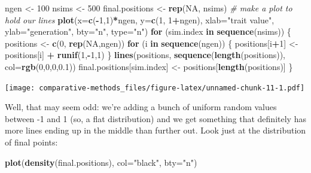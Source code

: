 \documentclass[]{article}
\newenvironment{Shaded}{\begin{snugshade}}{\end{snugshade}}
\newcommand{\CommentTok}[1]{\textcolor[rgb]{0.56,0.35,0.01}{\textit{#1}}}
\newcommand{\ControlFlowTok}[1]{\textcolor[rgb]{0.13,0.29,0.53}{\textbf{#1}}}
\newcommand{\DataTypeTok}[1]{\textcolor[rgb]{0.13,0.29,0.53}{#1}}
\newcommand{\DecValTok}[1]{\textcolor[rgb]{0.00,0.00,0.81}{#1}}
\newcommand{\FloatTok}[1]{\textcolor[rgb]{0.00,0.00,0.81}{#1}}
\newcommand{\KeywordTok}[1]{\textcolor[rgb]{0.13,0.29,0.53}{\textbf{#1}}}
\newcommand{\NormalTok}[1]{#1}
\newcommand{\OperatorTok}[1]{\textcolor[rgb]{0.81,0.36,0.00}{\textbf{#1}}}
\newcommand{\OtherTok}[1]{\textcolor[rgb]{0.56,0.35,0.01}{#1}}
\newcommand{\StringTok}[1]{\textcolor[rgb]{0.31,0.60,0.02}{#1}}
\theoremstyle{definition}
\theoremstyle{definition}
\theoremstyle{definition}
\theoremstyle{remark}
\begin{document}
\begin{Shaded}
\begin{Highlighting}[]
\NormalTok{ngen <-}\StringTok{ }\DecValTok{100}
\NormalTok{nsims <-}\StringTok{ }\DecValTok{500}
\NormalTok{final.positions <-}\StringTok{ }\KeywordTok{rep}\NormalTok{(}\OtherTok{NA}\NormalTok{, nsims)}
\CommentTok{# make a plot to hold our lines}
\KeywordTok{plot}\NormalTok{(}\DataTypeTok{x=}\KeywordTok{c}\NormalTok{(}\OperatorTok{-}\DecValTok{1}\NormalTok{,}\DecValTok{1}\NormalTok{)}\OperatorTok{*}\NormalTok{ngen, }\DataTypeTok{y=}\KeywordTok{c}\NormalTok{(}\DecValTok{1}\NormalTok{, }\DecValTok{1}\OperatorTok{+}\NormalTok{ngen), }\DataTypeTok{xlab=}\StringTok{"trait value"}\NormalTok{, }\DataTypeTok{ylab=}\StringTok{"generation"}\NormalTok{, }\DataTypeTok{bty=}\StringTok{"n"}\NormalTok{, }\DataTypeTok{type=}\StringTok{"n"}\NormalTok{)}
\ControlFlowTok{for}\NormalTok{ (sim.index }\ControlFlowTok{in} \KeywordTok{sequence}\NormalTok{(nsims)) \{}
\NormalTok{  positions <-}\StringTok{ }\KeywordTok{c}\NormalTok{(}\DecValTok{0}\NormalTok{, }\KeywordTok{rep}\NormalTok{(}\OtherTok{NA}\NormalTok{,ngen))}
  \ControlFlowTok{for}\NormalTok{ (i }\ControlFlowTok{in} \KeywordTok{sequence}\NormalTok{(ngen)) \{}
\NormalTok{    positions[i}\OperatorTok{+}\DecValTok{1}\NormalTok{] <-}\StringTok{ }\NormalTok{positions[i] }\OperatorTok{+}\StringTok{ }\KeywordTok{runif}\NormalTok{(}\DecValTok{1}\NormalTok{,}\OperatorTok{-}\DecValTok{1}\NormalTok{,}\DecValTok{1}\NormalTok{)}
\NormalTok{  \}}
  \KeywordTok{lines}\NormalTok{(positions, }\KeywordTok{sequence}\NormalTok{(}\KeywordTok{length}\NormalTok{(positions)), }\DataTypeTok{col=}\KeywordTok{rgb}\NormalTok{(}\DecValTok{0}\NormalTok{,}\DecValTok{0}\NormalTok{,}\DecValTok{0}\NormalTok{,}\FloatTok{0.1}\NormalTok{))}
\NormalTok{  final.positions[sim.index] <-}\StringTok{ }\NormalTok{positions[}\KeywordTok{length}\NormalTok{(positions)]}
\NormalTok{\}}
\end{Highlighting}
\end{Shaded}

\texttt{[image: comparative-methods\_files/figure-latex/unnamed-chunk-11-1.pdf]}

Well, that may seem odd: we're adding a bunch of uniform random values
between -1 and 1 (so, a flat distribution) and we get something that
definitely has more lines ending up in the middle than further out. Look
just at the distribution of final points:

\begin{Shaded}
\begin{Highlighting}[]
\KeywordTok{plot}\NormalTok{(}\KeywordTok{density}\NormalTok{(final.positions), }\DataTypeTok{col=}\StringTok{"black"}\NormalTok{, }\DataTypeTok{bty=}\StringTok{"n"}\NormalTok{)}
\end{Highlighting}
\end{Shaded}
\end{document}
